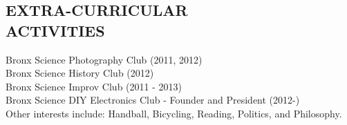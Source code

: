\documentclass[margin]{res}
\begin{document}
\begin{resume}
\section{EXTRA-CURRICULAR \\ ACTIVITIES}             
            Bronx Science Photography Club (2011, 2012) \\
            Bronx Science History Club (2012) \\
            Bronx Science Improv Club (2011 - 2013) \\
            Bronx Science DIY Electronics Club - Founder and President (2012-) \\
            Other interests include: Handball, Bicycling, Reading, Politics, and Philosophy.

\end{resume}
\end{document}

